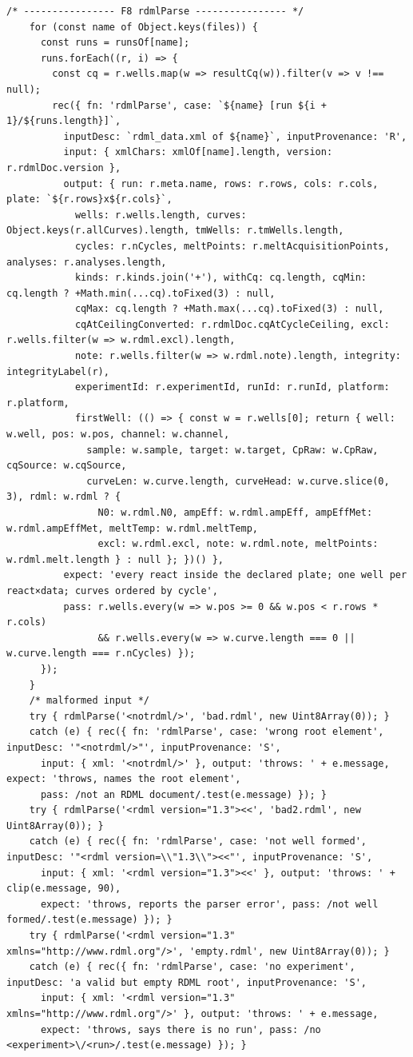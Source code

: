 \begin{lstlisting}[style=js]
    /* ---------------- F8 rdmlParse ---------------- */
    for (const name of Object.keys(files)) {
      const runs = runsOf[name];
      runs.forEach((r, i) => {
        const cq = r.wells.map(w => resultCq(w)).filter(v => v !== null);
        rec({ fn: 'rdmlParse', case: `${name} [run ${i + 1}/${runs.length}]`,
          inputDesc: `rdml_data.xml of ${name}`, inputProvenance: 'R',
          input: { xmlChars: xmlOf[name].length, version: r.rdmlDoc.version },
          output: { run: r.meta.name, rows: r.rows, cols: r.cols, plate: `${r.rows}x${r.cols}`,
            wells: r.wells.length, curves: Object.keys(r.allCurves).length, tmWells: r.tmWells.length,
            cycles: r.nCycles, meltPoints: r.meltAcquisitionPoints, analyses: r.analyses.length,
            kinds: r.kinds.join('+'), withCq: cq.length, cqMin: cq.length ? +Math.min(...cq).toFixed(3) : null,
            cqMax: cq.length ? +Math.max(...cq).toFixed(3) : null,
            cqAtCeilingConverted: r.rdmlDoc.cqAtCycleCeiling, excl: r.wells.filter(w => w.rdml.excl).length,
            note: r.wells.filter(w => w.rdml.note).length, integrity: integrityLabel(r),
            experimentId: r.experimentId, runId: r.runId, platform: r.platform,
            firstWell: (() => { const w = r.wells[0]; return { well: w.well, pos: w.pos, channel: w.channel,
              sample: w.sample, target: w.target, CpRaw: w.CpRaw, cqSource: w.cqSource,
              curveLen: w.curve.length, curveHead: w.curve.slice(0, 3), rdml: w.rdml ? {
                N0: w.rdml.N0, ampEff: w.rdml.ampEff, ampEffMet: w.rdml.ampEffMet, meltTemp: w.rdml.meltTemp,
                excl: w.rdml.excl, note: w.rdml.note, meltPoints: w.rdml.melt.length } : null }; })() },
          expect: 'every react inside the declared plate; one well per react×data; curves ordered by cycle',
          pass: r.wells.every(w => w.pos >= 0 && w.pos < r.rows * r.cols)
                && r.wells.every(w => w.curve.length === 0 || w.curve.length === r.nCycles) });
      });
    }
    /* malformed input */
    try { rdmlParse('<notrdml/>', 'bad.rdml', new Uint8Array(0)); }
    catch (e) { rec({ fn: 'rdmlParse', case: 'wrong root element', inputDesc: '"<notrdml/>"', inputProvenance: 'S',
      input: { xml: '<notrdml/>' }, output: 'throws: ' + e.message, expect: 'throws, names the root element',
      pass: /not an RDML document/.test(e.message) }); }
    try { rdmlParse('<rdml version="1.3"><<', 'bad2.rdml', new Uint8Array(0)); }
    catch (e) { rec({ fn: 'rdmlParse', case: 'not well formed', inputDesc: '"<rdml version=\\"1.3\\"><<"', inputProvenance: 'S',
      input: { xml: '<rdml version="1.3"><<' }, output: 'throws: ' + clip(e.message, 90),
      expect: 'throws, reports the parser error', pass: /not well formed/.test(e.message) }); }
    try { rdmlParse('<rdml version="1.3" xmlns="http://www.rdml.org"/>', 'empty.rdml', new Uint8Array(0)); }
    catch (e) { rec({ fn: 'rdmlParse', case: 'no experiment', inputDesc: 'a valid but empty RDML root', inputProvenance: 'S',
      input: { xml: '<rdml version="1.3" xmlns="http://www.rdml.org"/>' }, output: 'throws: ' + e.message,
      expect: 'throws, says there is no run', pass: /no <experiment>\/<run>/.test(e.message) }); }


\end{lstlisting}

